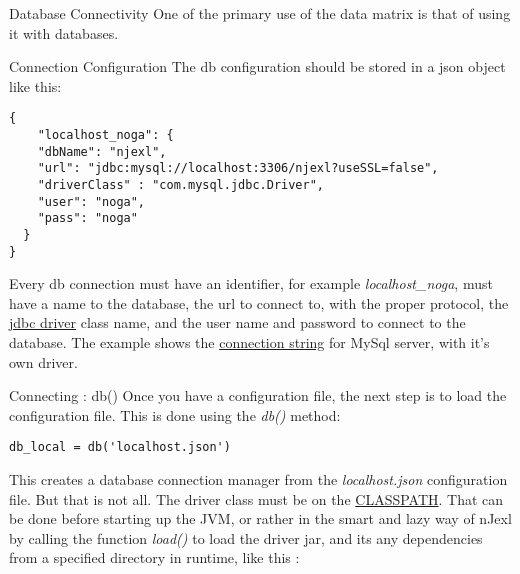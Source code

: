 \begin{section}{Database Connectivity}
One of the primary use of the data matrix is that of using it with databases.

\begin{subsection}{Connection Configuration}
The db configuration should be stored in a json object like this:

\begin{center}\begin{minipage}{\linewidth}
\begin{lstlisting}[style=JexlStyle]
{
    "localhost_noga": {
    "dbName": "njexl",
    "url": "jdbc:mysql://localhost:3306/njexl?useSSL=false",
    "driverClass" : "com.mysql.jdbc.Driver",
    "user": "noga",
    "pass": "noga"
  }
}
\end{lstlisting}
\end{minipage}\end{center}
Every db connection must have an identifier, for example \emph{localhost\_noga},
must have a name to the database, the url to connect to, with the proper protocol,
the \href{https://en.wikipedia.org/wiki/JDBC\_driver}{jdbc driver} class name,
and the user name and password to connect to the database.
The example shows the 
\href{http://www.java2s.com/Tutorial/Java/0340\_\_Database/AListofJDBCDriversconnectionstringdrivername.htm}{connection string} 
for MySql server, with it's own driver.
\end{subsection}

\begin{subsection}{Connecting : db()}
Once you have a configuration file, the next step is to load the configuration file.
This is done using the \emph{db()} method:
\begin{center}\begin{minipage}{\linewidth}
\begin{lstlisting}[style=JexlStyle]
db_local = db('localhost.json')
\end{lstlisting}
\end{minipage}\end{center}
This creates a database connection manager from the \emph{localhost.json} configuration file.
But that is not all. The driver class must be on the \href{https://en.wikipedia.org/wiki/Classpath\_(Java)}{CLASSPATH}.
That can be done before starting up the JVM, or rather in the smart and lazy way of nJexl by calling the 
function \emph{load()}   to load the driver jar, and its any dependencies from a specified
directory in runtime, like this :


\end{subsection}
\end{section}
